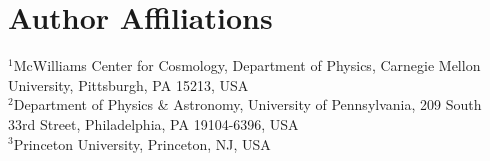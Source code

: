 \documentclass{openjournal}
\begin{document}
\section*{Author Affiliations}

\noindent $^1$McWilliams Center for Cosmology, Department of Physics, Carnegie Mellon University, Pittsburgh, PA 15213, USA \\
$^2$Department of Physics \& Astronomy, University of Pennsylvania, 209 South 33rd Street, Philadelphia, PA 19104-6396, USA\\
$^3$Princeton University, Princeton, NJ, USA\\


  
\end{document}
